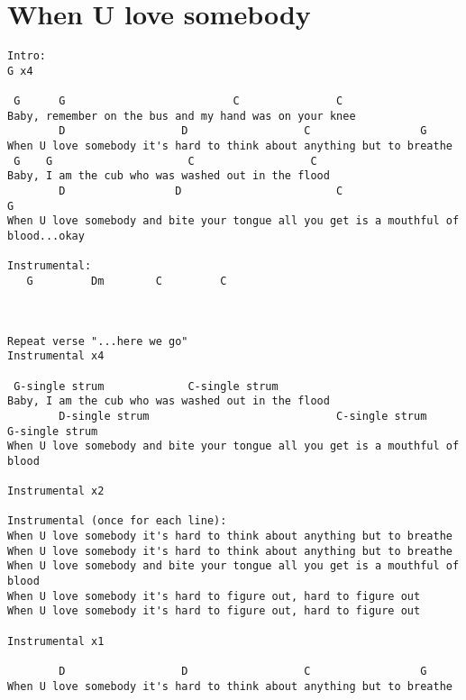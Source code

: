 \documentclass[leqno]{memoir}
\begin{document}
\chapter{When U love somebody}
\begin{verbatim}
Intro:
G x4

 G      G                          C               C
Baby, remember on the bus and my hand was on your knee
        D                  D                  C                 G
When U love somebody it's hard to think about anything but to breathe
 G    G                     C                  C
Baby, I am the cub who was washed out in the flood
        D                 D                        C                     G
When U love somebody and bite your tongue all you get is a mouthful of blood...okay

Instrumental:
   G         Dm        C         C



Repeat verse "...here we go"
Instrumental x4

 G-single strum             C-single strum
Baby, I am the cub who was washed out in the flood
        D-single strum                             C-single strum        G-single strum
When U love somebody and bite your tongue all you get is a mouthful of blood

Instrumental x2

Instrumental (once for each line):
When U love somebody it's hard to think about anything but to breathe
When U love somebody it's hard to think about anything but to breathe
When U love somebody and bite your tongue all you get is a mouthful of blood
When U love somebody it's hard to figure out, hard to figure out
When U love somebody it's hard to figure out, hard to figure out

Instrumental x1

        D                  D                  C                 G
When U love somebody it's hard to think about anything but to breathe
\end{verbatim}
\newpage
\end{document}
